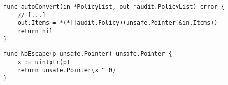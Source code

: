 \begin{lstlisting}[language=Golang, label=lst:unsafe-ex-in-place-cast, caption=In-place cast using the \unsafe{} package
from the Kubernetes \textit{k8s.io/apiserver} module with minor changes.
,float, belowskip=-1.5em]
func autoConvert(in *PolicyList, out *audit.PolicyList) error {
	// [...]
	out.Items = *(*[]audit.Policy)(unsafe.Pointer(&in.Items))
	return nil
}
\end{lstlisting}

\begin{lstlisting}[language=Golang, label=lst:unsafe-ex-escape-analysis, caption=Hiding a value from escape analysis from the \textit{modern-go/reflect2} module.
, float, belowskip=-1.5em]
func NoEscape(p unsafe.Pointer) unsafe.Pointer {
	x := uintptr(p)
	return unsafe.Pointer(x ^ 0)
}
\end{lstlisting}





